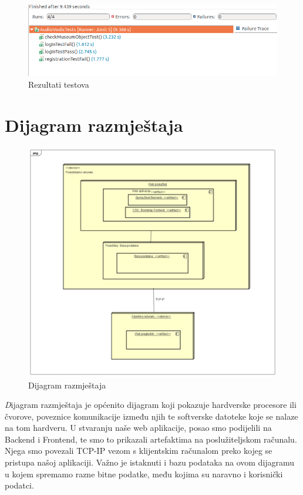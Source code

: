   	 	 	\begin{figure}[H]
  	 	 		\includegraphics[scale=0.62]{slike/testoviRez.png}
  	 	 		\centering
  	 	 		\caption{Rezultati testova}
  	 	 		\label{fig:promjene}
  	 	 	\end{figure}
			
			\eject 
		
		
		\section{Dijagram razmještaja}
			
			\begin{figure}[H]
				\includegraphics[scale=0.42]{slike/Dijagram_razmjestaja.png}
				\centering
				\caption{Dijagram razmještaja}
				\label{fig:promjene}
			\end{figure}
			
			\textit Dijagram razmještaja je općenito dijagram koji pokazuje hardverske procesore ili čvorove, poveznice komunikacije između njih te softverske datoteke koje se nalaze na tom hardveru. U stvaranju naše web aplikacije, posao smo podijelili na Backend i Frontend, te smo to prikazali artefaktima na poslužiteljskom računalu. Njega smo povezali TCP-IP vezom s klijentskim računalom preko kojeg se pristupa našoj aplikaciji. Važno je istaknuti i bazu podataka na ovom dijagramu u kojem spremamo razne bitne podatke, među kojima su naravno i korisnički podatci. 
			
